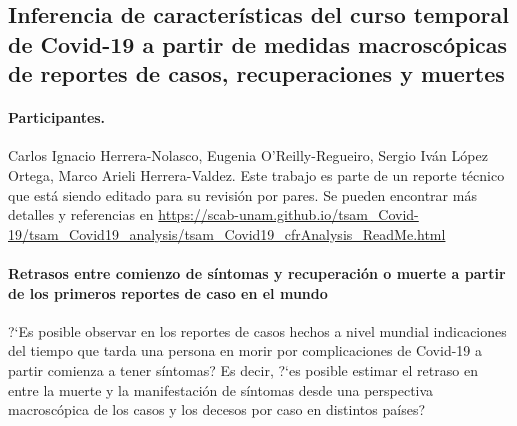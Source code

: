 \subsection*{Inferencia de características del curso temporal de Covid-19 a partir de medidas macroscópicas de reportes de casos, recuperaciones y muertes}

\paragraph{Participantes.} Carlos Ignacio Herrera-Nolasco, Eugenia O'Reilly-Regueiro, Sergio Iván López Ortega, Marco Arieli Herrera-Valdez. Este trabajo es parte de un reporte técnico que está siendo editado para su revisión por pares. Se pueden encontrar más detalles y referencias en \url{https://scab-unam.github.io/tsam_Covid-19/tsam_Covid19_analysis/tsam_Covid19_cfrAnalysis_ReadMe.html}
\paragraph{Retrasos entre comienzo de síntomas y recuperación o muerte a partir de los primeros reportes de caso en el mundo}


?`Es posible observar en los reportes de casos hechos a nivel mundial indicaciones del tiempo que tarda una persona en morir por complicaciones de Covid-19 a partir comienza a tener síntomas? Es decir, ?`es posible estimar el retraso en entre la muerte y la manifestación de síntomas desde una perspectiva macroscópica de los casos y los decesos por caso en distintos países?


